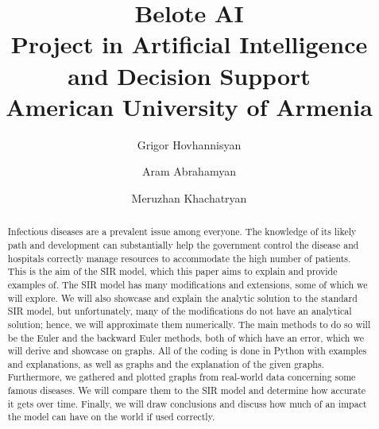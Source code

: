 \documentclass[a4paper,12pt]{article}
\title{
    Belote AI \\
        \large Project in Artificial Intelligence and Decision Support \\ American University of Armenia \\
}
\author{Grigor Hovhannisyan
\and
Aram Abrahamyan
\and
Meruzhan Khachatryan
}
\begin{document}
{ %
\maketitle\thispagestyle{empty}
\vspace{1cm}{}
}
\vspace{1cm}


{
    \newpage
    \hypersetup{linkcolor=black} %
    \tableofcontents
}

\newpage
\begin{abstract}
    Infectious diseases are a prevalent issue among everyone.
    The knowledge of its likely path and development can substantially help the government control the disease and hospitals correctly manage resources to accommodate the high number of patients.
    This is the aim of the SIR model, which this paper aims to explain and provide examples of.
    The SIR model has many modifications and extensions, some of which we will explore.
    We will also showcase and explain the analytic solution to the standard SIR model, but unfortunately, many of the modifications do not have an analytical solution; hence, we will approximate them numerically.
    The main methods to do so will be the Euler and the backward Euler methods, both of which have an error, which we will derive and showcase on graphs.
    All of the coding is done in Python with examples and explanations, as well as graphs and the explanation of the given graphs.
    Furthermore, we gathered and plotted graphs from real-world data concerning some famous diseases.
    We will compare them to the SIR model and determine how accurate it gets over time.
    Finally, we will draw conclusions and discuss how much of an impact the model can have on the world if used correctly.
\end{abstract}

\newpage
\pagestyle{fancy} %
\lhead{\nouppercase{\rightmark}}
\rhead{}





\newpage
\thispagestyle{SectionFirstPage} %
\rhead{}
\renewcommand\refname{References}
\printbibliography
\end{document}
